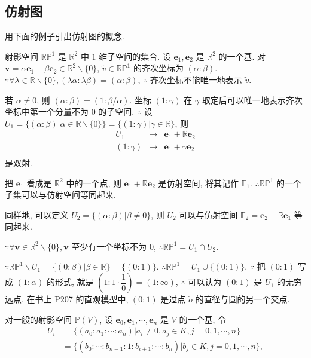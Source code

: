 \documentclass[color=black,device=normal,lang=cn,mode=geye]{elegantnote}
\begin{document}
\subsection{仿射图}
用下面的例子引出仿射图的概念.
\begin{example}
    射影空间 $\mathbb{RP}^1$ 是 $\mathbb{R}^2$ 中 $1$ 维子空间的集合. 设 $\boldsymbol{e}_1,\boldsymbol{e}_2$ 是 $\mathbb{R}^2$ 的一个基. 对 $\boldsymbol{v}=\alpha\boldsymbol{e}_1+\beta\boldsymbol{e}_2\in\mathbb{R}^2\backslash\{0\}$, $\tilde{v}\in\mathbb{RP}^1$ 的齐次坐标为 $(\alpha:\beta)$. $\because\forall\lambda\in\mathbb{R}\backslash\{0\},(\lambda\alpha:\lambda\beta)=(\alpha:\beta)$, $\therefore$ 齐次坐标不能唯一地表示 $\tilde{v}$.
    
    若 $\alpha\neq0$, 则 $(\alpha:\beta)=(1:\beta/\alpha)$. 坐标 $(1:\gamma)$ 在 $\gamma$ 取定后可以唯一地表示齐次坐标中第一个分量不为 $0$ 的子空间. $\therefore$ 设 $U_1=\{(\alpha:\beta)|\alpha\in\mathbb{R}\backslash\{0\}\}=\{(1:\gamma)|\gamma\in\mathbb{R}\}$, 则
    \[\begin{array}{rcl}
        U_1 & \to & \boldsymbol{e}_1+\mathbb{R}\boldsymbol{e}_2 \\
        (1:\gamma) & \to & \boldsymbol{e}_1+\gamma\boldsymbol{e}_2 \\
    \end{array}\]
    是双射.
    
    把 $\boldsymbol{e}_1$ 看成是 $\mathbb{R}^2$ 中的一个点, 则 $\boldsymbol{e}_1+\mathbb{R}\boldsymbol{e}_2$ 是仿射空间, 将其记作 $\mathbb{E}_1$. $\therefore\mathbb{RP}^1$ 的一个子集可以与仿射空间等同起来.

    同样地, 可以定义 $U_2=\{(\alpha:\beta)|\beta\neq0\}$, 则 $U_2$ 可以与仿射空间 $\mathbb{E}_2=\boldsymbol{e}_2+\mathbb{R}\boldsymbol{e}_1$ 等同起来.

    $\because\forall\boldsymbol{v}\in\mathbb{R}^2\backslash\{0\},\boldsymbol{v}$ 至少有一个坐标不为 $0$, $\therefore\mathbb{RP}^1=U_1\cap U_2$.

    $\because\mathbb{RP}^1\backslash U_1=\{(0:\beta)|\beta\in\mathbb{R}\}=\{(0:1)\}$. $\therefore\mathbb{RP}^1=U_1\cup\{(0:1)\}$. $\because$ 把 $(0:1)$ 写成 $(1:\alpha)$ 的形式, 就是 $\left(1:1\cdot\dfrac{1}{0}\right)=(1:\infty)$, $\therefore$ 可以认为 $(0:1)$ 是 $U_1$ 的无穷远点. 在书上 P207 的直观模型中, $(0:1)$ 是过点 $\dot{o}$ 的直径与圆的另一个交点.
\end{example}
对一般的射影空间 $\mathbb{P}(V)$, 设 $\boldsymbol{e}_0,\boldsymbol{e}_1,\cdots,\boldsymbol{e}_n$ 是 $V$ 的一个基, 令
\begin{align*}
    U_i & =\{(a_0:a_1:\cdots:a_n)|a_i\neq0,a_j\in K,j=0,1,\cdots,n\} \\
    & =\{(b_0:\cdots:b_{n-1}:1:b_{i+1}:\cdots:b_n)|b_j\in K,j=0,1,\cdots,n\},
\end{align*}
\end{document}
